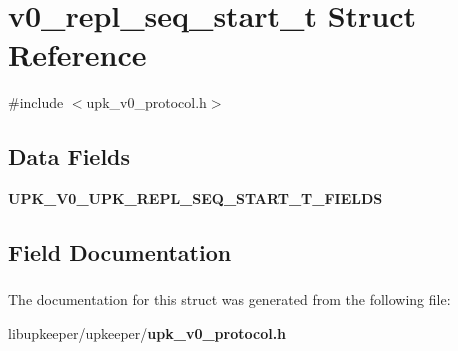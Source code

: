 \section{v0\_\-repl\_\-seq\_\-start\_\-t Struct Reference}
\label{structv0__repl__seq__start__t}


{\ttfamily \#include $<$upk\_\-v0\_\-protocol.h$>$}

\subsection*{Data Fields}
\begin{DoxyCompactItemize}
\item 
{\bf UPK\_\-V0\_\-UPK\_\-REPL\_\-SEQ\_\-START\_\-T\_\-FIELDS}
\end{DoxyCompactItemize}


\subsection{Field Documentation}
\subsubsection[{UPK\_\-V0\_\-UPK\_\-REPL\_\-SEQ\_\-START\_\-T\_\-FIELDS}]{}\label{structv0__repl__seq__start__t_a187d1a3a9c4099ea2254f8a8c629fb2b}


The documentation for this struct was generated from the following file:\begin{DoxyCompactItemize}
\item 
libupkeeper/upkeeper/{\bf upk\_\-v0\_\-protocol.h}\end{DoxyCompactItemize}
